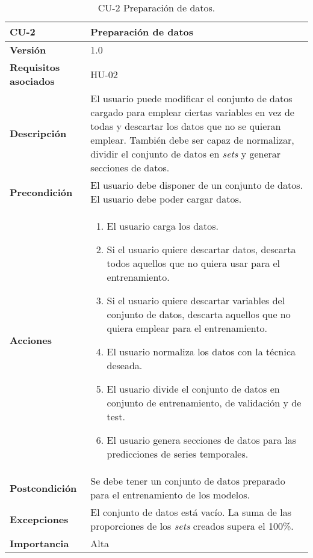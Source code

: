 \begin{table}[p]
	\centering
	\begin{tabularx}{\linewidth}{ p{} p{} }
		\toprule
		\textbf{CU-2}    & \textbf{Preparación de datos}\\
		\toprule
		\textbf{Versión}              & 1.0    \\
		\textbf{Requisitos asociados} & HU-02 \\
		\textbf{Descripción}          & El usuario puede modificar el conjunto de datos cargado para emplear ciertas variables en vez de todas y descartar los datos que no se quieran emplear. También debe ser capaz de normalizar, dividir el conjunto de datos en \textit{sets} y generar secciones de datos. \\
		\textbf{Precondición}         & El usuario debe disponer de un conjunto de datos. El usuario debe poder cargar datos. \\
		\textbf{Acciones}             &
		\begin{enumerate}
			\def\labelenumi{\arabic{enumi}.}
			\tightlist
			\item El usuario carga los datos.
            \item Si el usuario quiere descartar datos, descarta todos aquellos que no quiera usar para el entrenamiento.
            \item Si el usuario quiere descartar variables del conjunto de datos, descarta aquellos que no quiera emplear para el entrenamiento.
            \item El usuario normaliza los datos con la técnica deseada.
            \item El usuario divide el conjunto de datos en conjunto de entrenamiento, de validación y de test.
            \item El usuario genera secciones de datos para las predicciones de series temporales.
		\end{enumerate}\\
		\textbf{Postcondición}        & Se debe tener un conjunto de datos preparado para el entrenamiento de los modelos. \\
		\textbf{Excepciones}          & El conjunto de datos está vacío. La suma de las proporciones de los \textit{sets} creados supera el 100\%. \\
		\textbf{Importancia}          & Alta \\
		\bottomrule
	\end{tabularx}
	\caption{CU-2 Preparación de datos.}
\end{table}

